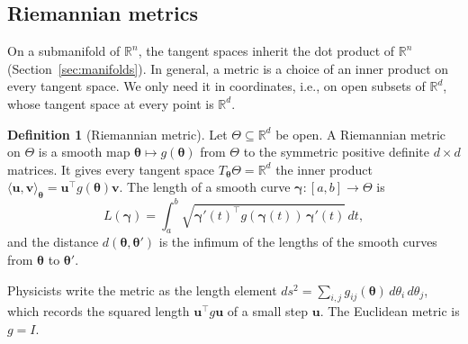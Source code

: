 \documentclass[11pt]{article}
\newcommand{\ip}[2]{\langle #1, #2 \rangle}
\theoremstyle{definition}
\newtheorem{definition}{Definition}[section]
\theoremstyle{plain}
\theoremstyle{remark}
\begin{document}
\subsection{Riemannian metrics}

On a submanifold of $\mathbb{R}^n$, the tangent spaces inherit the dot product of $\mathbb{R}^n$ (Section~\ref{sec:manifolds}). In general, a metric is a choice of an inner product on every tangent space. We only need it in coordinates, i.e., on open subsets of $\mathbb{R}^d$, whose tangent space at every point is $\mathbb{R}^d$.

\begin{definition}[Riemannian metric]\label{def:riemannian-metric}
    Let $\Theta \subseteq \mathbb{R}^d$ be open. A Riemannian metric on $\Theta$ is a smooth map $\boldsymbol{\theta} \mapsto g(\boldsymbol{\theta})$ from $\Theta$ to the symmetric positive definite $d \times d$ matrices. It gives every tangent space $T_{\boldsymbol{\theta}}\Theta = \mathbb{R}^d$ the inner product $\ip{\mathbf{u}}{\mathbf{v}}_{\boldsymbol{\theta}} = \mathbf{u}^\top g(\boldsymbol{\theta})\mathbf{v}$. The length of a smooth curve $\boldsymbol{\gamma}: [a, b] \to \Theta$ is
    \[L(\boldsymbol{\gamma}) = \int_a^b \sqrt{\boldsymbol{\gamma}'(t)^\top g(\boldsymbol{\gamma}(t))\,\boldsymbol{\gamma}'(t)}\, dt,\]
    and the distance $d(\boldsymbol{\theta}, \boldsymbol{\theta}')$ is the infimum of the lengths of the smooth curves from $\boldsymbol{\theta}$ to $\boldsymbol{\theta}'$.
\end{definition}

Physicists write the metric as the length element $ds^2 = \sum_{i,j} g_{ij}(\boldsymbol{\theta})\, d\theta_i\, d\theta_j$, which records the squared length $\mathbf{u}^\top g\mathbf{u}$ of a small step $\mathbf{u}$. The Euclidean metric is $g = I$.
\end{document}
